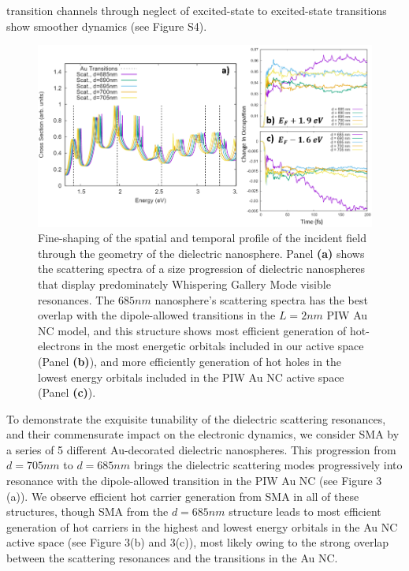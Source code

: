 \documentclass[journal=jpclcd,manuscript=article]{achemso}
\begin{document}
transition channels through neglect of excited-state to excited-state transitions show smoother dynamics
(see Figure S4).
\begin{figure}
\begin{center}
\includegraphics[width=6in]{Au_WGM_Spectrum_and_Trajectories.png}
\caption{Fine-shaping of the spatial and temporal profile of the incident field
through the geometry of the dielectric nanosphere.  Panel {\bf (a)} shows
the scattering spectra of a size progression of dielectric nanospheres that display
predominately Whispering Gallery Mode visible resonances.  The
$685nm$ nanosphere's scattering spectra has the best overlap with the dipole-allowed
transitions in the $L=2nm$ PIW Au NC model, and this structure shows most efficient
generation of hot-electrons in the most energetic orbitals included in our
active space (Panel {\bf (b)}), and more efficiently generation of
hot holes in the lowest energy orbitals included in the PIW Au NC active space (Panel
{\bf (c)}).   }
\end{center}
\end{figure}

To demonstrate the exquisite tunability of the dielectric scattering resonances, and their 
commensurate impact on the electronic dynamics, we consider SMA by a series of 5 different Au-decorated dielectric
nanospheres.  This progression from $d=705 nm$ to $d=685 nm$ brings the dielectric scattering modes progressively 
into resonance with the dipole-allowed transition in the PIW Au NC (see Figure 3 (a)).  We observe efficient hot carrier
generation from SMA in all of these structures, though SMA from the $d=685 nm$ structure leads to most efficient generation
of hot carriers in the highest and lowest energy orbitals in the Au NC active space (see Figure 3(b) and 3(c)), 
most likely owing to the strong overlap between the scattering resonances and the transitions in the Au NC.  
\end{document}
